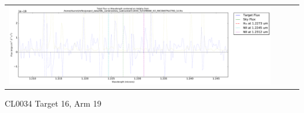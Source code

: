 \documentclass[10pt,letterpaper]{article}
\begin{document}
\begin{table}[h!]
\begin{center}
\begin{tabular}{ >{\centering\arraybackslash}m{2.5in} >{\centering\arraybackslash}m{2.5in} >{\centering\arraybackslash}m{2.5in} >{\centering\arraybackslash}m{2.3in}}
\includegraphics[scale=0.45]{../figures/CL0034_YJ/COMBINE_SCI_RECONSTRUCTED_14_Halpha.pdf}
\end{tabular}
\end{center}
\end{table}

\newpage 

CL0034 Target 16, Arm 19 \\
\end{document}
